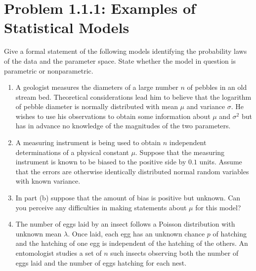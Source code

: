 \documentclass{amsbook}
\theoremstyle{definition}
\theoremstyle{remark}
\numberwithin{section}{chapter}
\numberwithin{equation}{chapter}
\begin{document}
\section{Problem 1.1.1: Examples of Statistical Models}
Give a formal statement of the following models identifying the probability laws of the data and the parameter space. State whether the model in question is parametric or nonparametric.
\begin{enumerate}[label=(\alph*)]
\item A geologist measures the diameters of a large number $n$ of pebbles in an old stream bed.
Theoretical considerations lead him to believe that the logarithm of pebble diameter is normally distributed with mean $\mu$ and variance $\sigma$.
He wishes to use his observations to obtain some information about $\mu$ and $\sigma^2$
but has in advance no knowledge of the magnitudes of the two parameters.
\item A measuring instrument is being used to obtain $n$ independent determinations of a physical constant $\mu$.
Suppose that the measuring instrument is known to be biased to the positive side by $0.1$ units.
Assume that the errors are otherwise identically distributed normal random variables with known variance.
\item In part (b) suppose that the amount of bias is positive but unknown. Can you perceive any difficulties in making statements about $\mu$ for this model?
\item The number of eggs laid by an insect follows a Poisson distribution with unknown mean $\lambda$.
Once laid, each egg has an unknown chance $p$ of hatching and the hatching of one egg is independent of the hatching of the others.
An entomologist studies a set of $n$ such insects observing both the number of eggs laid and the number of eggs hatching for each nest.
\end{enumerate}
\end{document}
